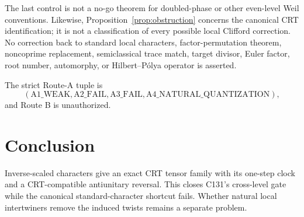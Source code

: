 \documentclass[11pt]{article}
\begin{document}
The last control is not a no-go theorem for doubled-phase or other even-level
Weil conventions.  Likewise, Proposition~\ref{prop:obstruction} concerns the
canonical CRT identification; it is not a classification of every possible
local Clifford correction.  No correction back to standard local characters,
factor-permutation theorem, noncoprime replacement, semiclassical trace match, target divisor, Euler
factor, root number, automorphy, or Hilbert--P\'olya operator is asserted.

The strict Route-A tuple is
\[
 (\mathrm{A1\_WEAK},\mathrm{A2\_FAIL},\mathrm{A3\_FAIL},
  \mathrm{A4\_NATURAL\_QUANTIZATION}),
\]
and Route B is unauthorized.

\section{Conclusion}

Inverse-scaled characters give an exact CRT tensor family with its one-step
clock and a CRT-compatible antiunitary reversal.  This closes C131's cross-level
gate while the canonical standard-character shortcut fails.  Whether natural
local intertwiners remove the induced twists remains a separate problem.
\end{document}
